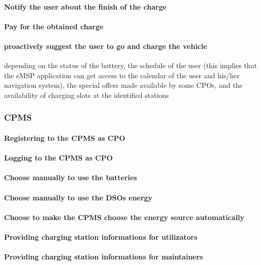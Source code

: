 \paragraph{Notify the user about the finish of the charge}

\paragraph{Pay for the obtained charge}

\paragraph{proactively suggest the user to go and charge the vehicle}
depending on the status of the
battery, the schedule of the user (this implies that the eMSP application can get access to the
calendar of the user and his/her navigation system), the special offers made available by some
CPOs, and the availability of charging slots at the identified stations

\subsubsection{\ac{CPMS}}
\paragraph{Registering to the \ac{CPMS} as \ac{CPO}}
\paragraph{Logging to the \ac{CPMS} as \ac{CPO}}
\paragraph{Choose manually to use the batteries}
\paragraph{Choose manually to use the \acp{DSO} energy}
\paragraph{Choose to make the \ac{CPMS} choose the energy source automatically}
\paragraph{Providing charging station informations for utilizators}
\paragraph{Providing charging station informations for maintainers}
